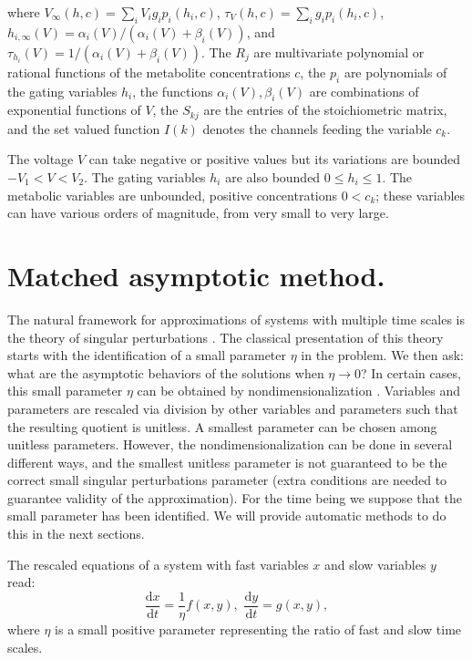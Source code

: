 \documentclass{llncs}
\newcommand{\vect}[1]{\ensuremath{  #1 } }
\newcommand{\D}[2]{ \ensuremath{ \frac{\mathrm{d} #1 }{\mathrm{d} #2 } }}
\begin{document}
where $V_{\infty}(\vect{h},\vect{c}) = \sum_i V_i g_i p_i (h_i,\vect{c})$,
$\tau_V(\vect{h},\vect{c}) = \sum_i g_i p_i (h_i,\vect{c})$,
$h_{i,\infty}(V) = \alpha_{i}(V)/(\alpha_{i}(V) + \beta_{i}(V))$, and
$\tau_{h_i}(V) = 1/(\alpha_{i}(V) + \beta_{i}(V))$.
The $R_j$ are multivariate polynomial or rational functions of the metabolite concentrations $\vect{c}$, the
$p_{i}$ are polynomials of the gating variables $h_i$,
the functions $\alpha_{i}(V),\beta_{i}(V)$ are combinations of exponential functions of $V$, the $S_{kj}$
are the entries of the stoichiometric matrix, and the set valued function $I(k)$ denotes the
channels feeding the variable $c_k$.

The voltage $V$ can take negative or positive values but its variations are
bounded $-V_{1} < V < V_2$. The gating variables $h_i$ are also bounded $0 \leq h_i \leq 1$.
The metabolic variables are unbounded, positive concentrations $0 < c_k$; these
variables can have various orders of magnitude, from very small to very large.

\section{Matched asymptotic method.}
The natural framework for approximations of systems with multiple time scales
is the theory of singular perturbations \cite{holmes2012introduction}. The classical presentation of this
theory starts with the identification of a small parameter $\eta$ in the
problem. We then ask: what are the asymptotic behaviors of the solutions when
$\eta \to 0$? In certain cases, this small parameter $\eta$ can be obtained by
nondimensionalization \cite{tang1996simplification}.
Variables and parameters are rescaled via division by
other variables and parameters such that the resulting quotient is unitless. A
smallest parameter can be chosen among unitless parameters. However, the
nondimensionalization can be done in several different ways, and the smallest
unitless parameter is not guaranteed to be the correct small singular
perturbations parameter (extra conditions are needed to guarantee validity of the
approximation). For the time being we suppose that the small parameter has been
identified. We will provide automatic methods to do this in the next sections.

The rescaled equations of a system with fast variables $\vect{x}$ and slow variables $\vect{y}$ read:
\begin{equation}
\D{\vect{x}}{t}  = \frac{1}{\eta} \vect{f}(\vect{x},\vect{y}),
\,\, \D{\vect{y}}{t}  =  \vect{g}(\vect{x},\vect{y}), \label{outer}
\end{equation}
where $\eta$ is a small positive parameter representing the ratio of fast and slow time scales.
\end{document}
